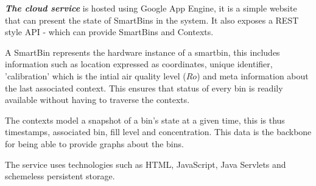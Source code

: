 \textit{\textbf{The cloud service}} is hosted using Google App Engine, it is a simple website that can present the state of SmartBins in the system. It also exposes a REST style API - which can provide SmartBins and Contexts.

A SmartBin represents the hardware instance of a smartbin, this includes information such as location expressed as coordinates, unique identifier, 'calibration' which is the intial air quality level ($Ro$) and meta information about the last associated context.
This ensures that status of every bin is readily available without having to traverse the contexts.

The contexts model a snapshot of a bin's state at a given time, this is thus timestamps, associated bin, fill level and concentration. This data is the backbone for being able to provide graphs about the bins.

The service uses technologies such as HTML, JavaScript, Java Servlets and schemeless persistent storage.

